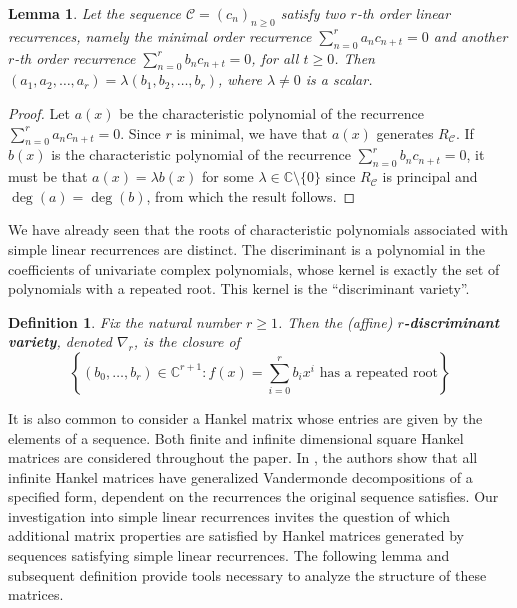 \documentclass[12pt,reqno]{article}
\newtheorem{lemma}{Lemma}
\newtheorem{definition}{Definition}
\newcommand{\cC}{\mathcal{C}}
\begin{document}
\begin{lemma}\label{Lem:UniqueRecurrence}
Let the sequence $\cC = (c_n)_{n \geq 0}$ satisfy two $r$-th order linear recurrences, namely the minimal order recurrence $\sum_{n=0}^r a_n c_{n+t} = 0$ and another $r$-th order recurrence $\sum_{n=0}^r b_n c_{n+t} = 0$, for all $t\geq 0$. Then $(a_1,a_2,\dotsc,a_r) = \lambda (b_1,b_2,\dotsc,b_r)$, where $\lambda \neq 0$ is a scalar.
\end{lemma}
\begin{proof}
Let $a(x)$ be the characteristic polynomial of the recurrence $\sum_{n=0}^r a_n c_{n+t} = 0$. Since $r$ is minimal, we have that $a(x)$ generates $R_{\cC}$. If $b(x)$ is the characteristic polynomial of the recurrence $\sum_{n=0}^r b_n c_{n+t} = 0$, it must be that $a(x) = \lambda b(x)$ for some $\lambda\in\mathbb{C} \setminus \{0\}$ since $R_{\cC}$ is principal and $\deg(a)=\deg(b)$, from which the result follows. 
\end{proof}

We have already seen that the roots of characteristic polynomials associated with simple linear recurrences are distinct. 
The discriminant is a polynomial in the coefficients of univariate complex polynomials, whose kernel is exactly the set of polynomials with a repeated root.  This kernel is the ``discriminant variety''.

\begin{definition}
Fix the natural number $r\geq 1$. Then the (affine) \textbf{$r$-discriminant variety}, denoted $\nabla_r$, is the closure of 
$$
\left \{(b_0,\dotsc,b_{r}) \in \mathbb{C}^{r+1} : f(x) = \sum_{i=0}^r b_i x^i \mbox{ has a repeated root} \right \}
$$
\end{definition}

It is also common to consider a Hankel matrix whose entries are given by the elements of a sequence. Both finite and infinite dimensional square Hankel matrices are considered throughout the paper. In \cite{BolLukVan}, the authors show that all infinite Hankel matrices have generalized Vandermonde decompositions of a specified form, dependent on the recurrences the original sequence satisfies. Our investigation into simple linear recurrences invites the question of which additional matrix properties are satisfied by Hankel matrices generated by sequences satisfying simple linear recurrences. The following lemma and subsequent definition provide tools necessary to analyze the structure of these matrices. 
\end{document}
